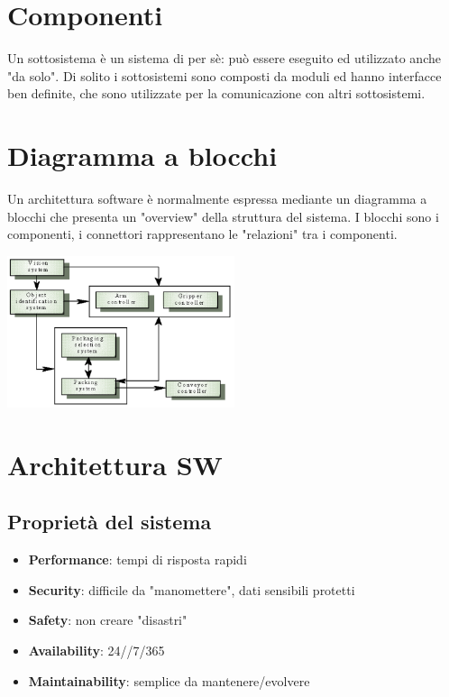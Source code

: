 \documentclass[12pt, a4paper]{report}
\begin{document}
\section{Componenti}
Un sottosistema è un sistema di per sè: può essere eseguito ed utilizzato anche "da solo". Di solito i sottosistemi sono composti da moduli ed hanno interfacce ben definite, che sono utilizzate per la comunicazione con altri sottosistemi.
\section{Diagramma a blocchi}
Un architettura software è normalmente espressa mediante un diagramma a blocchi che presenta un "overview" della struttura del sistema. I blocchi sono i componenti, i connettori rappresentano le "relazioni" tra i componenti.
\begin{center}
    \includegraphics[width=0.5\textwidth]{Immagini/diagrammablocchi.png}
\end{center}
\section{Architettura SW}
\subsection{Proprietà del sistema}
\begin{itemize}
    \item \textbf{Performance}: tempi di risposta rapidi
    \item \textbf{Security}: difficile da "manomettere", dati sensibili protetti
    \item \textbf{Safety}: non creare "disastri"
    \item \textbf{Availability}: 24//7/365
    \item \textbf{Maintainability}: semplice da mantenere/evolvere
\end{itemize} 
\end{document}
